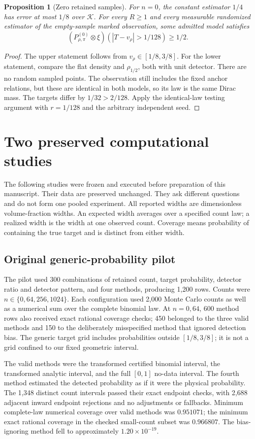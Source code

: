 \documentclass[11pt]{article}
\newtheorem{proposition}[theorem]{Proposition}
\theoremstyle{remark}
\newcommand{\K}{\mathcal K}
\begin{document}
\begin{proposition}[Zero retained samples]\label{prop:empty}
For $n=0$, the constant estimator $1/4$ has error at most $1/8$ over
$\K$. For every $R\ge1$ and every measurable randomized estimator of
the empty-sample marked observation, some admitted model satisfies
\[
 (P_{\rho,\pi}^{(0)}\otimes\xi)(|T-v_\rho|>1/128)\ge1/2.
\]
\end{proposition}
\begin{proof}
The upper statement follows from $v_\rho\in[1/8,3/8]$.
For the lower statement, compare the flat density and
$\rho_{1/2}$, both with unit detector. There are no random sampled
points. The observation still includes the fixed anchor relations, but
these are identical in both models, so its law is the same Dirac mass.
The targets differ by $1/32>2/128$. Apply the identical-law testing
argument with $r=1/128$ and the arbitrary independent seed.
\end{proof}

\section{Two preserved computational studies}\label{sec:studies}
The following studies were frozen and executed before preparation of this
manuscript. Their data are preserved unchanged. They ask different
questions and do not form one pooled experiment. All reported widths are
dimensionless volume-fraction widths. An expected width averages over a
specified count law; a realized width is the width at one observed count.
Coverage means probability of containing the true target and is distinct
from either width.

\subsection{Original generic-probability pilot}
The pilot used 300 combinations of retained count, target probability,
detector ratio and detector pattern, and four methods, producing 1,200
rows. Counts were $n\in\{0,64,256,1024\}$. Each configuration used
2,000 Monte Carlo counts as well as a numerical sum over the complete
binomial law. At $n=0,64$, 600 method rows also received exact rational
coverage checks; 450 belonged to the three valid methods and 150 to the
deliberately misspecified method that ignored detection bias.
The generic target grid includes probabilities outside $[1/8,3/8]$;
it is not a grid confined to our fixed geometric interval.

The valid methods were the transformed certified binomial interval, the
transformed analytic interval, and the full $[0,1]$ no-data interval.
The fourth method estimated the detected probability as if it were the
physical probability. The 1,348 distinct count intervals passed their
exact endpoint checks, with 2,688 adjacent inward endpoint rejections and
no adjustments or fallbacks. Minimum complete-law numerical coverage
over valid methods was $0.951071$; the minimum exact rational coverage
in the checked small-count subset was $0.966807$.
The bias-ignoring method fell to approximately $1.20\times10^{-19}$.
\end{document}
